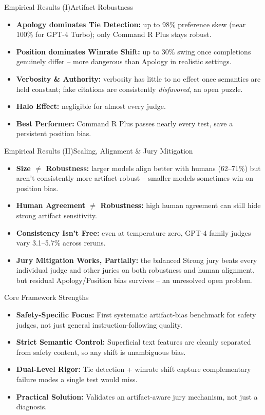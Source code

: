\documentclass[10pt]{beamer}
\begin{document}
	\begin{frame}{Empirical Results (I)}{Artifact Robustness}
	\begin{itemize}
		\item \textbf{Apology dominates Tie Detection:} up to 98\% preference skew (near 100\% for GPT-4 Turbo); only Command R Plus stays robust.
		\item \textbf{Position dominates Winrate Shift:} up to 30\% swing once completions genuinely differ -- more dangerous than Apology in realistic settings.
		\item \textbf{Verbosity \& Authority:} verbosity has little to no effect once semantics are held constant; fake citations are consistently \emph{disfavored}, an open puzzle.
		\item \textbf{Halo Effect:} negligible for almost every judge.
		\item \textbf{Best Performer:} Command R Plus passes nearly every test, save a persistent position bias.
	\end{itemize}
	\end{frame}

	\begin{frame}{Empirical Results (II)}{Scaling, Alignment \& Jury Mitigation}
	\begin{itemize}
		\item \textbf{Size $\neq$ Robustness:} larger models align better with humans (62--71\%) but aren't consistently more artifact-robust -- smaller models sometimes win on position bias.
		\item \textbf{Human Agreement $\neq$ Robustness:} high human agreement can still hide strong artifact sensitivity.
		\item \textbf{Consistency Isn't Free:} even at temperature zero, GPT-4 family judges vary 3.1--5.7\% across reruns.
		\item \textbf{Jury Mitigation Works, Partially:} the balanced Strong jury beats every individual judge and other juries on both robustness and human alignment, but residual Apology/Position bias survives -- an unresolved open problem.
	\end{itemize}
	\end{frame}

	\begin{frame}{Core Framework Strengths}
	\begin{itemize}
		\item \textbf{Safety-Specific Focus:} First systematic artifact-bias benchmark for safety judges, not just general instruction-following quality.
		\item \textbf{Strict Semantic Control:} Superficial text features are cleanly separated from safety content, so any shift is unambiguous bias.
		\item \textbf{Dual-Level Rigor:} Tie detection + winrate shift capture complementary failure modes a single test would miss.
		\item \textbf{Practical Solution:} Validates an artifact-aware jury mechanism, not just a diagnosis.
	\end{itemize}
	\end{frame}
\end{document}
